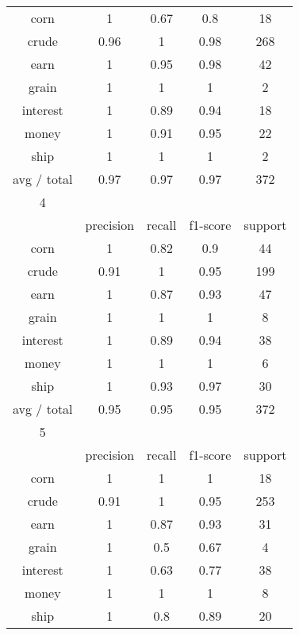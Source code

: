 \documentclass[11pt]{article}
\begin{document}
\begin{center}
\begin{longtable}{| c | c | c | c | c |}
corn        & 1         & 0.67   & 0.8      & 18      \\
crude       & 0.96      & 1      & 0.98     & 268     \\
earn        & 1         & 0.95   & 0.98     & 42      \\
grain       & 1         & 1      & 1        & 2       \\
interest    & 1         & 0.89   & 0.94     & 18      \\
money       & 1         & 0.91   & 0.95     & 22      \\
ship        & 1         & 1      & 1        & 2       \\

avg / total & 0.97      & 0.97   & 0.97     & 372     \\

\hline
4           &           &        &          &         \\
\hline
           & precision & recall & f1-score & support \\

corn        & 1         & 0.82   & 0.9      & 44      \\
crude       & 0.91      & 1      & 0.95     & 199     \\
earn        & 1         & 0.87   & 0.93     & 47      \\
grain       & 1         & 1      & 1        & 8       \\
interest    & 1         & 0.89   & 0.94     & 38      \\
money       & 1         & 1      & 1        & 6       \\
ship        & 1         & 0.93   & 0.97     & 30      \\

avg / total & 0.95      & 0.95   & 0.95     & 372     \\

\hline
5           &           &        &          &         \\
\hline
           & precision & recall & f1-score & support \\

corn        & 1         & 1      & 1        & 18      \\
crude       & 0.91      & 1      & 0.95     & 253     \\
earn        & 1         & 0.87   & 0.93     & 31      \\
grain       & 1         & 0.5    & 0.67     & 4       \\
interest    & 1         & 0.63   & 0.77     & 38      \\
money       & 1         & 1      & 1        & 8       \\
ship        & 1         & 0.8    & 0.89     & 20      \\


\end{longtable}
\end{center}
\end{document}

